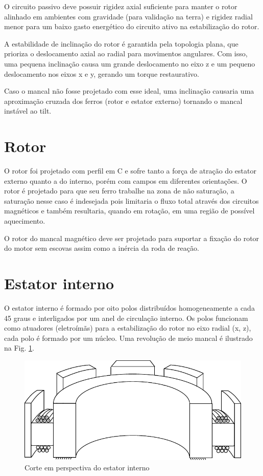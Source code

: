 O circuito passivo deve possuir rigidez axial suficiente para manter o rotor alinhado em ambientes com gravidade (para validação na terra) e rigidez radial menor para um baixo gasto energético do circuito ativo na estabilização do rotor.

A estabilidade de inclinação do rotor é garantida pela topologia plana, que prioriza o deslocamento axial ao radial para movimentos angulares.
Com isso, uma pequena inclinação causa um grande deslocamento no eixo z e um pequeno deslocamento nos eixos x e y, gerando um torque restaurativo. 

Caso o mancal não fosse projetado com esse ideal, uma inclinação causaria uma aproximação cruzada dos ferros (rotor e estator externo) tornando o mancal instável ao tilt. 

\section{Rotor}

O rotor foi projetado com perfil em C e sofre tanto a força de atração do estator externo quanto a do interno, porém com campos em diferentes orientações. O rotor é projetado para que seu ferro trabalhe na zona de não saturação, a saturação nesse caso é indesejada pois limitaria o fluxo total através dos circuitos magnéticos e também resultaria, quando em rotação, em uma região de possível aquecimento.

O rotor do mancal magnético deve ser projetado para suportar a fixação do rotor do motor sem escovas assim como a inércia da roda de reação. 

\section{Estator interno}

O estator interno é formado por oito polos distribuídos homogeneamente a cada 45 graus e interligados por um anel de circulação interno. Os polos funcionam como atuadores (eletroímãs) para a estabilização do rotor no eixo radial (x, z),  cada polo é formado por um núcleo. Uma revolução de meio mancal é ilustrado na Fig. \ref{fig:modelo:mancal:estator:interno}. 

\begin{figure}[ht!]
	\centering
	\includegraphics[width=1\linewidth]{./Figs/modelo_mancal_estator_interno}
	\caption{Corte em perspectiva do estator interno}
	\label{fig:modelo:mancal:estator:interno}
\end{figure}

